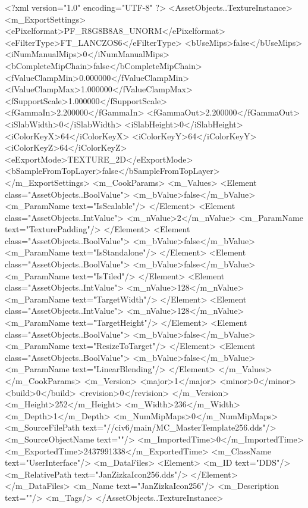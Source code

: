 <?xml version="1.0" encoding="UTF-8" ?>
<AssetObjects..TextureInstance>
	<m_ExportSettings>
		<ePixelformat>PF_R8G8B8A8_UNORM</ePixelformat>
		<eFilterType>FT_LANCZOS6</eFilterType>
		<bUseMips>false</bUseMips>
		<iNumManualMips>0</iNumManualMips>
		<bCompleteMipChain>false</bCompleteMipChain>
		<fValueClampMin>0.000000</fValueClampMin>
		<fValueClampMax>1.000000</fValueClampMax>
		<fSupportScale>1.000000</fSupportScale>
		<fGammaIn>2.200000</fGammaIn>
		<fGammaOut>2.200000</fGammaOut>
		<iSlabWidth>0</iSlabWidth>
		<iSlabHeight>0</iSlabHeight>
		<iColorKeyX>64</iColorKeyX>
		<iColorKeyY>64</iColorKeyY>
		<iColorKeyZ>64</iColorKeyZ>
		<eExportMode>TEXTURE_2D</eExportMode>
		<bSampleFromTopLayer>false</bSampleFromTopLayer>
	</m_ExportSettings>
	<m_CookParams>
		<m_Values>
			<Element class="AssetObjects..BoolValue">
				<m_bValue>false</m_bValue>
				<m_ParamName text="IsScalable"/>
			</Element>
			<Element class="AssetObjects..IntValue">
				<m_nValue>2</m_nValue>
				<m_ParamName text="TexturePadding"/>
			</Element>
			<Element class="AssetObjects..BoolValue">
				<m_bValue>false</m_bValue>
				<m_ParamName text="IsStandalone"/>
			</Element>
			<Element class="AssetObjects..BoolValue">
				<m_bValue>false</m_bValue>
				<m_ParamName text="IsTiled"/>
			</Element>
			<Element class="AssetObjects..IntValue">
				<m_nValue>128</m_nValue>
				<m_ParamName text="TargetWidth"/>
			</Element>
			<Element class="AssetObjects..IntValue">
				<m_nValue>128</m_nValue>
				<m_ParamName text="TargetHeight"/>
			</Element>
			<Element class="AssetObjects..BoolValue">
				<m_bValue>false</m_bValue>
				<m_ParamName text="ResizeToTarget"/>
			</Element>
			<Element class="AssetObjects..BoolValue">
				<m_bValue>false</m_bValue>
				<m_ParamName text="LinearBlending"/>
			</Element>
		</m_Values>
	</m_CookParams>
	<m_Version>
		<major>1</major>
		<minor>0</minor>
		<build>0</build>
		<revision>0</revision>
	</m_Version>
	<m_Height>252</m_Height>
	<m_Width>236</m_Width>
	<m_Depth>1</m_Depth>
	<m_NumMipMaps>0</m_NumMipMaps>
	<m_SourceFilePath text="//civ6/main/MC_MasterTemplate\Textures\JanZizkaIcon256.dds"/>
	<m_SourceObjectName text=""/>
	<m_ImportedTime>0</m_ImportedTime>
	<m_ExportedTime>2437991338</m_ExportedTime>
	<m_ClassName text="UserInterface"/>
	<m_DataFiles>
		<Element>
			<m_ID text="DDS"/>
			<m_RelativePath text="JanZizkaIcon256.dds"/>
		</Element>
	</m_DataFiles>
	<m_Name text="JanZizkaIcon256"/>
	<m_Description text=""/>
	<m_Tags/>
</AssetObjects..TextureInstance>


